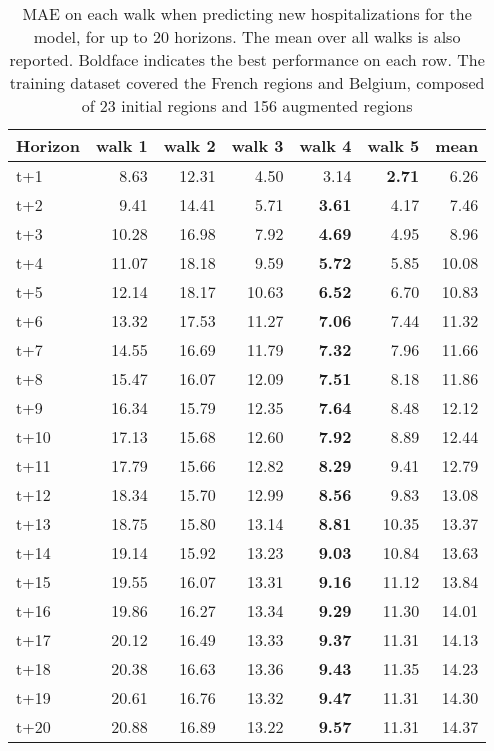 \begin{table}[H]
\centering
\caption{MAE on each walk when predicting new hospitalizations for the model, for up to 20 horizons. The mean over all walks is also reported. Boldface indicates the best performance on each row. The training dataset covered the French regions and Belgium, composed of 23 initial regions and 156 augmented regions }
\label{tab:MAE_walk_encoder_decoder}
\begin{tabular}{lrrrrrr}
\toprule
Horizon &  walk 1 &  walk 2 &  walk 3 &  walk 4 &  walk 5 &  mean \\
\midrule
t+1  & 8.63  & 12.31  & 4.50  & 3.14  & \textbf{2.71}  & 6.26  \\
t+2  & 9.41  & 14.41  & 5.71  & \textbf{3.61}  & 4.17  & 7.46  \\
t+3  & 10.28  & 16.98  & 7.92  & \textbf{4.69}  & 4.95  & 8.96  \\
t+4  & 11.07  & 18.18  & 9.59  & \textbf{5.72}  & 5.85  & 10.08  \\
t+5  & 12.14  & 18.17  & 10.63  & \textbf{6.52}  & 6.70  & 10.83  \\
t+6  & 13.32  & 17.53  & 11.27  & \textbf{7.06}  & 7.44  & 11.32  \\
t+7  & 14.55  & 16.69  & 11.79  & \textbf{7.32}  & 7.96  & 11.66  \\
t+8  & 15.47  & 16.07  & 12.09  & \textbf{7.51}  & 8.18  & 11.86  \\
t+9  & 16.34  & 15.79  & 12.35  & \textbf{7.64}  & 8.48  & 12.12  \\
t+10  & 17.13  & 15.68  & 12.60  & \textbf{7.92}  & 8.89  & 12.44  \\
t+11  & 17.79  & 15.66  & 12.82  & \textbf{8.29}  & 9.41  & 12.79  \\
t+12  & 18.34  & 15.70  & 12.99  & \textbf{8.56}  & 9.83  & 13.08  \\
t+13  & 18.75  & 15.80  & 13.14  & \textbf{8.81}  & 10.35  & 13.37  \\
t+14  & 19.14  & 15.92  & 13.23  & \textbf{9.03}  & 10.84  & 13.63  \\
t+15  & 19.55  & 16.07  & 13.31  & \textbf{9.16}  & 11.12  & 13.84  \\
t+16  & 19.86  & 16.27  & 13.34  & \textbf{9.29}  & 11.30  & 14.01  \\
t+17  & 20.12  & 16.49  & 13.33  & \textbf{9.37}  & 11.31  & 14.13  \\
t+18  & 20.38  & 16.63  & 13.36  & \textbf{9.43}  & 11.35  & 14.23  \\
t+19  & 20.61  & 16.76  & 13.32  & \textbf{9.47}  & 11.31  & 14.30  \\
t+20  & 20.88  & 16.89  & 13.22  & \textbf{9.57}  & 11.31  & 14.37  \\

\bottomrule
\end{tabular}
\end{table}
